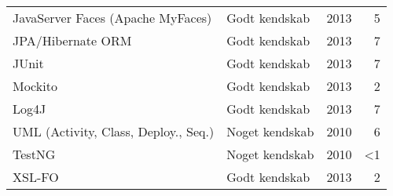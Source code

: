 \documentclass[a4paper,11pt]{article}
\begin{document}
\begin{tabularx}{\textwidth}{X l r r}
  JavaServer Faces (Apache MyFaces)         & Godt kendskab   & 2013  &     5 \\
  JPA/Hibernate ORM                         & Godt kendskab   & 2013  &     7 \\
  JUnit                                     & Godt kendskab   & 2013  &     7 \\
  Mockito                                   & Godt kendskab   & 2013  &     2 \\
  Log4J                                     & Godt kendskab   & 2013  &     7 \\
  UML (Activity, Class, Deploy., Seq.)      & Noget kendskab  & 2010  &     6 \\
  TestNG                                    & Noget kendskab  & 2010  &    \textless1 \\
  XSL-FO                                    & Godt kendskab   & 2013  &     2 \\
  \hline
\end{tabularx}
\end{document}
